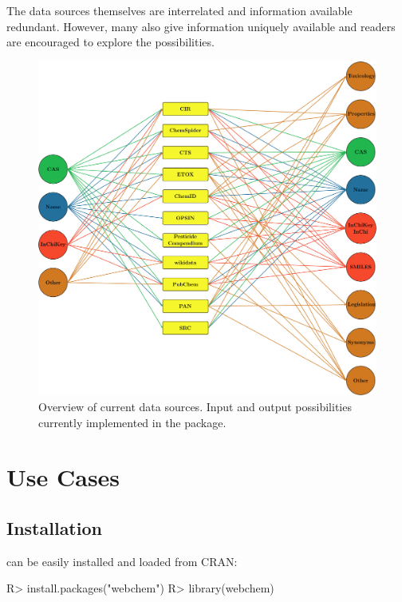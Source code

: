 \documentclass[article, shortnames]{jss}\usepackage[]{graphicx}\usepackage[]{color}
\begin{document}
The data sources themselves are interrelated and information available redundant. However, many also give information uniquely available and readers are encouraged to explore the possibilities.

\begin{figure}[ht]
  \centering
  \includegraphics{fig1.pdf}
  \caption{Overview of current data sources. Input and output possibilities currently implemented in the package.}
  \label{fig:fig1}
\end{figure}


\section[Use Cases]{Use Cases}
\subsection[Install webchem]{Installation}
 can be easily installed and loaded from CRAN:

\begin{CodeChunk}
\begin{CodeInput}
R> install.packages("webchem")
R> library(webchem)
\end{CodeInput}
\end{CodeChunk}
\end{document}
